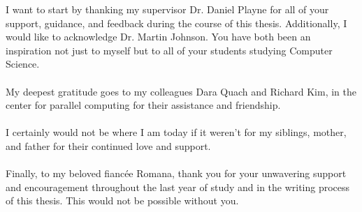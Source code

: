 I want to start by thanking my supervisor Dr. Daniel Playne for all of your support, guidance, and feedback during the course of this thesis. Additionally, I would like to acknowledge Dr. Martin Johnson. You have both been an inspiration not just to myself but to all of your students studying Computer Science. \\
\\
\noindent
My deepest gratitude goes to my colleagues Dara Quach and Richard Kim, in the center for parallel computing for their assistance and friendship. \\
\\
\noindent
I certainly would not be where I am today if it weren't for my siblings, mother, and father for their continued love and support.\\
\\
\noindent
Finally, to my beloved fianc\'{e}e Romana, thank you for your unwavering support and encouragement throughout the last year of study and in the writing process of this thesis. This  would not be possible without you.